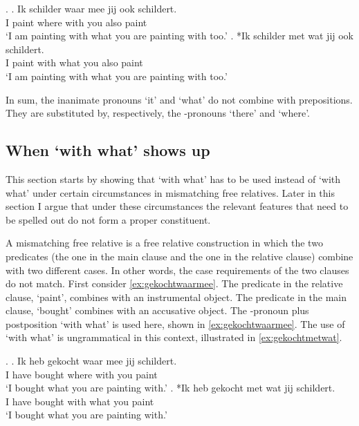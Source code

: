 \documentclass[11pt,a4paper]{article}
\begin{document}
 \ex.\label{ex:headless}
 \ag. Ik schilder waar mee jij ook schildert.\\
  I paint where with you also paint\\
  `I am painting with what you are painting with too.'
 \bg. *Ik schilder met wat jij ook schildert.\\
  I paint with what you also paint\\
  `I am painting with what you are painting with too.'

In sum, the inanimate pronouns  `it' and  `what' do not combine with prepositions. They are substituted by, respectively, the -pronouns  `there' and  `where'.


\subsection{When  `with what' shows up}

This section starts by showing that  `with what' has to be used instead of  `with what' under certain circumstances in mismatching free relatives. Later in this section I argue that under these circumstances the relevant features that need to be spelled out do not form a proper constituent.

A mismatching free relative is a free relative construction in which the two predicates (the one in the main clause and the one in the relative clause) combine with two different cases. In other words, the case requirements of the two clauses do not match. First consider \ref{ex:gekochtwaarmee}. The predicate in the relative clause,  `paint', combines with an instrumental object. The predicate in the main clause,  `bought' combines with an accusative object. The -pronoun plus postposition  `with what' is used here, shown in \ref{ex:gekochtwaarmee}. The use of  `with what' is ungrammatical in this context, illustrated in \ref{ex:gekochtmetwat}.

\ex.
\ag. Ik heb gekocht waar mee jij schildert.\\
 I have bought where with you paint\\
 `I bought what you are painting with.'\label{ex:gekochtwaarmee}
\bg. *Ik heb gekocht met wat jij schildert.\\
 I have bought with what you paint\\
 `I bought what you are painting with.'\label{ex:gekochtmetwat}
\end{document}
